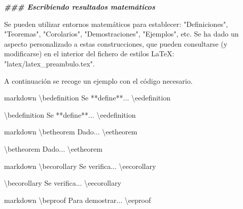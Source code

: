 \documentclass[11pt,a4paper,oneside,]{article}
\newenvironment{Shaded}{\begin{snugshade}}{\end{snugshade}}
\newcommand{\AttributeTok}[1]{\textcolor[rgb]{0.77,0.63,0.00}{#1}}
\newcommand{\DocumentationTok}[1]{\textcolor[rgb]{0.56,0.35,0.01}{\textbf{\textit{#1}}}}
\newcommand{\FunctionTok}[1]{\textcolor[rgb]{0.00,0.00,0.00}{#1}}
\newcommand{\NormalTok}[1]{#1}
\newcommand{\SpecialCharTok}[1]{\textcolor[rgb]{0.00,0.00,0.00}{#1}}
\newcommand{\StringTok}[1]{\textcolor[rgb]{0.31,0.60,0.02}{#1}}
\numberwithin{dummy}{section}
\theoremstyle{ocrenumbox}
\theoremstyle{blacknumex}
\theoremstyle{blacknumbox}
\theoremstyle{ocrenum}
\theoremstyle{ocrenum}
\begin{document}
\begin{Shaded}
\begin{Highlighting}[numbers=left,,firstnumber=1101,]
\DocumentationTok{\#\#\# Escribiendo resultados matemáticos}

\NormalTok{Se pueden utilizar entornos matemáticos para establecer}\SpecialCharTok{:} \StringTok{"Definiciones"}\NormalTok{, }\StringTok{"Teoremas"}\NormalTok{, }\StringTok{"Corolarios"}\NormalTok{, }\StringTok{"Demostraciones"}\NormalTok{, }\StringTok{"Ejemplos"}\NormalTok{, etc. Se ha dado un aspecto personalizado a estas construcciones, que pueden }\FunctionTok{consultarse}\NormalTok{ (y modificarse) en el interior del fichero de estilos LaTeX}\SpecialCharTok{:} \StringTok{"latex/latex\_preambulo.tex"}\NormalTok{.}

\NormalTok{A continuación se recoge un ejemplo con el código necesario.}

\StringTok{\textasciigrave{}\textasciigrave{}\textasciigrave{}}\AttributeTok{markdown}
\SpecialCharTok{\textbackslash{}b}\AttributeTok{edefinition}
\AttributeTok{Se **define**... }
\SpecialCharTok{\textbackslash{}e}\AttributeTok{edefinition}
\StringTok{\textasciigrave{}\textasciigrave{}\textasciigrave{}}

\NormalTok{\textbackslash{}bedefinition}
\NormalTok{Se }\SpecialCharTok{**}\NormalTok{define}\SpecialCharTok{**}\NormalTok{... }
\NormalTok{\textbackslash{}eedefinition}

\StringTok{\textasciigrave{}\textasciigrave{}\textasciigrave{}}\AttributeTok{markdown}
\SpecialCharTok{\textbackslash{}b}\AttributeTok{etheorem}
\AttributeTok{Dado...}
\SpecialCharTok{\textbackslash{}e}\AttributeTok{etheorem}
\StringTok{\textasciigrave{}\textasciigrave{}\textasciigrave{}}


\NormalTok{\textbackslash{}betheorem}
\NormalTok{Dado...}
\NormalTok{\textbackslash{}eetheorem}

\StringTok{\textasciigrave{}\textasciigrave{}\textasciigrave{}}\AttributeTok{markdown}
\SpecialCharTok{\textbackslash{}b}\AttributeTok{ecorollary}
\AttributeTok{Se verifica...}
\SpecialCharTok{\textbackslash{}e}\AttributeTok{ecorollary}
\StringTok{\textasciigrave{}\textasciigrave{}\textasciigrave{}}


\NormalTok{\textbackslash{}becorollary}
\NormalTok{Se verifica...}
\NormalTok{\textbackslash{}eecorollary}

\StringTok{\textasciigrave{}\textasciigrave{}\textasciigrave{}}\AttributeTok{markdown}
\SpecialCharTok{\textbackslash{}b}\AttributeTok{eproof}
\AttributeTok{Para demostrar...}
\SpecialCharTok{\textbackslash{}e}\AttributeTok{eproof}
\StringTok{\textasciigrave{}\textasciigrave{}\textasciigrave{}}



\end{Highlighting}
\end{Shaded}
\end{document}
